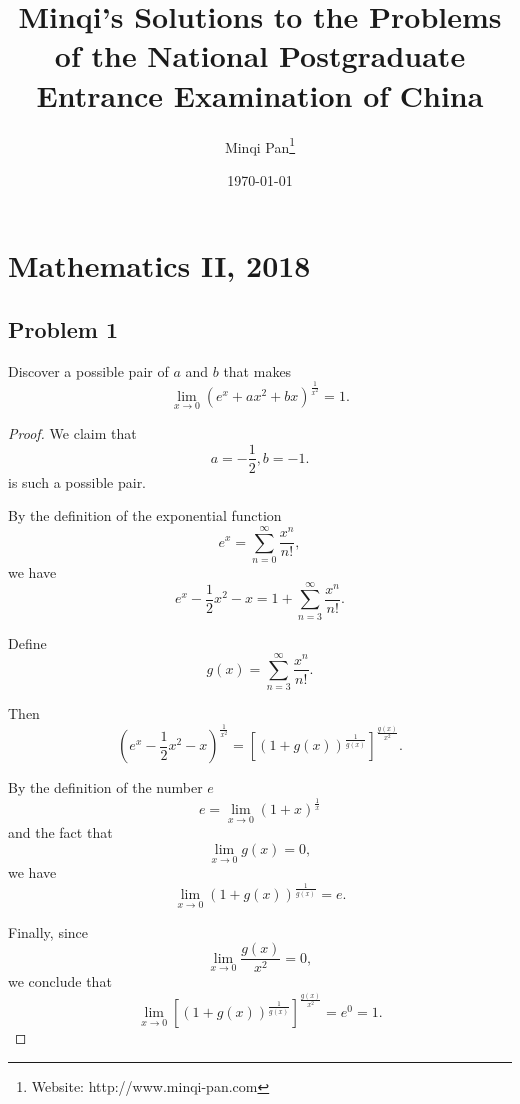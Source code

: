 \documentclass{amsbook}
\theoremstyle{definition}
\theoremstyle{remark}
\numberwithin{section}{chapter}
\numberwithin{equation}{chapter}
\begin{document}

\frontmatter

\title{Minqi's Solutions to the Problems of the National Postgraduate Entrance Examination of China}

\author{Minqi Pan\footnote{Website: http://www.minqi-pan.com}}

\date{\today}

\maketitle

\setcounter{page}{4}

\tableofcontents

\mainmatter

\chapter{Mathematics II, 2018}
\section{Problem 1}
Discover a possible pair of $a$ and $b$ that makes \[
\lim_{x\to 0}\left(e^x+ax^2+bx\right)^{\frac{1}{x^2}}=1.
\]
\begin{proof}
We claim that\[
a=-\frac{1}{2},b=-1.
\] is such a possible pair.

By the definition of the exponential function \[
e^x=\sum_{n=0}^\infty \frac{x^n}{n!},
\] we have\[
e^x-\frac{1}{2}x^2-x=1+\sum_{n=3}^\infty \frac{x^n}{n!}.
\]

Define \[
g(x)=\sum_{n=3}^\infty \frac{x^n}{n!}.
\]

Then \[
\left(e^x-\frac{1}{2}x^2-x\right)^{\frac{1}{x^2}}=\left[\left(1+g(x)\right)^\frac{1}{g(x)}\right]^\frac{g(x)}{x^2}.
\]

By the definition of the number $e$\[
e=\lim_{x\to 0}(1+x)^\frac{1}{x}
\] and the fact that \[
\lim_{x\to 0}g(x)=0,
\] we have \[
\lim_{x\to 0}\left(1+g(x)\right)^\frac{1}{g(x)}=e.
\]

Finally, since \[
\lim_{x\to 0}\frac{g(x)}{x^2}=0,
\] we conclude that \[
\lim_{x\to 0}\left[\left(1+g(x)\right)^\frac{1}{g(x)}\right]^\frac{g(x)}{x^2}=e^0=1.
\]
\end{proof}
\end{document}
